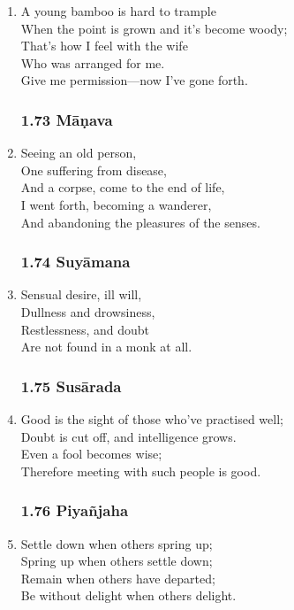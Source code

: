 \documentclass[10pt, openany]{book}
\begin{document}
\begin{enumerate}
\item A young bamboo is hard to trample\\
When the point is grown and it’s become woody;\\
That’s how I feel with the wife \\
Who was arranged for me.\\
Give me permission—now I’ve gone forth. 

\subsubsection*{1.73 Māṇava}

\item Seeing an old person,\\
One suffering from disease,\\
And a corpse, come to the end of life,\\
I went forth, becoming a wanderer,\\
And abandoning the pleasures of the senses.

\subsubsection*{1.74 Suyāmana}

\item Sensual desire, ill will,\\
Dullness and drowsiness,\\
Restlessness, and doubt\\
Are not found in a monk at all.

\subsubsection*{1.75 Susārada}

\item Good is the sight of those who’ve practised well;\\
Doubt is cut off, and intelligence grows.\\
Even a fool becomes wise;\\
Therefore meeting with such people is good.

\subsubsection*{1.76 Piyañjaha}

\item Settle down when others spring up;\\
Spring up when others settle down;\\
Remain when others have departed;\\
Be without delight when others delight.


\end{enumerate}
\end{document}
